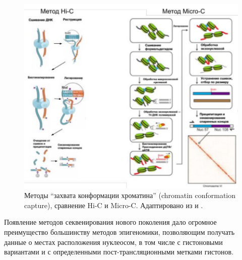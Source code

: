 \begin{figure} [h!]
    \centering
    \includegraphics [width=\textwidth]{images/p1/part1_5_genome/p1_5_genome_f5.pdf}
    \caption[Методы ``захвата конформации хроматина''.]{Методы ``захвата конформации хроматина'' (chromatin conformation capture), сравнение Hi-C и Micro-C. Адаптировано из \cite{lieberman-aiden_comprehensive_2009} и \cite{hsieh_mapping_2015}.}
    \label{fig:p1_5_genome:f5}
\end{figure}


    Появление методов секвенирования нового поколения дало огромное преимущество большинству методов эпигеномики, позволяющим получать данные о местах расположения нуклеосом, в том числе с гистоновыми вариантами и с определенными пост-трансляционными метками гистонов. 

